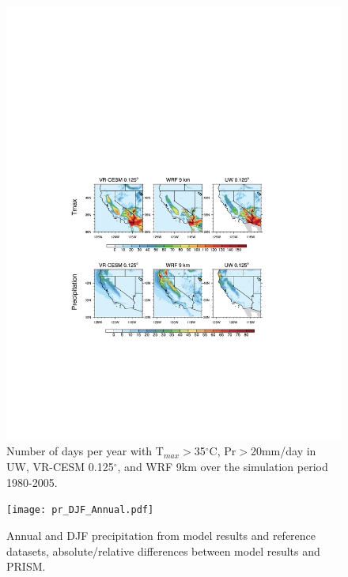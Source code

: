 \documentclass[draft,ms]{agutex}   %
\begin{document}
\begin{figure}
\begin{center}
\includegraphics[width=6in]{t2max>35_pr>20.pdf}
\end{center}
\caption{Number of days per year with T$_{max}$$>$35$^\circ$C, Pr$>$20mm/day in UW, VR-CESM 0.125$^\circ$, and WRF 9km over the simulation period 1980-2005.} \label{fig:Figure 15}
\end{figure}


\begin{figure}
\begin{center}
\texttt{[image: pr\_DJF\_Annual.pdf]}
\end{center}
\caption{Annual and DJF precipitation from model results and reference datasets, absolute/relative differences between model results and PRISM.} \label{fig:Figure 9}
\end{figure}
\end{document}
